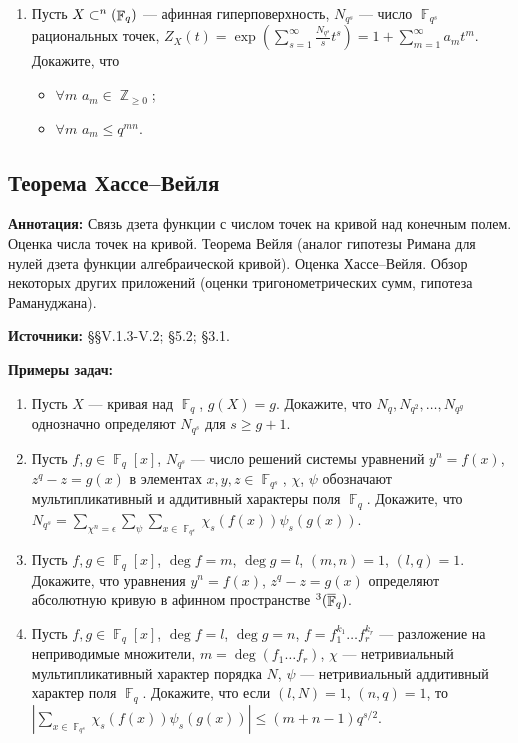 \documentclass[a4paper, 12pt]{article}
\DeclareMathOperator{\ZZ}{\mathbb{Z}}
\let\AA\relax
\DeclareMathOperator{\AA}{\mathbb{A}}
\DeclareMathOperator{\FF}{\mathbb{F}}
\begin{document}
\begin{enumerate}[noitemsep,topsep=0pt]
    \item Пусть $X\subset \AA^n(\FF_q)$ --- афинная гиперповерхность, $N_{q^s}$ --- число $\FF_{q^s}$ рациональных точек, $Z_X(t)=\exp\left(\sum_{s=1}^\infty \frac{N_{q^s}}{s} t^s\right) = 1+\sum_{m=1}^\infty a_m t^m$. Докажите, что 
    \begin{itemize}[noitemsep,topsep=0pt]
        \item $\forall m$ $a_m\in\ZZ_{\geqslant 0}$;
        \item $\forall m$ $a_m\leqslant q^{mn}$.
    \end{itemize} %
\end{enumerate}

\subsection{Теорема Хассе--Вейля}

{\bf Аннотация:} Связь дзета функции с числом точек на кривой над конечным полем. Оценка числа точек на кривой. Теорема Вейля (аналог гипотезы Римана для нулей дзета функции алгебраической кривой). Оценка Хассе--Вейля. Обзор некоторых других приложений (оценки тригонометрических сумм, гипотеза Рамануджана).

{\bf Источники:} \cite{Step} \S\S V.1.3-V.2; \cite{Stich}  \S 5.2; \cite{VNTs} \S 3.1.

{\bf Примеры задач:}
\begin{enumerate}[noitemsep,topsep=0pt]
    \item Пусть $X$ --- кривая над $\FF_q$, $g(X)=g$. Докажите, что $N_{q},N_{q^2},\dots, N_{q^g}$ однозначно определяют $N_{q^s}$ для $s\geqslant g+1$. %
    \item Пусть $f,g\in\FF_q[x]$, $N_{q^s}$ --- число решений системы уравнений $y^n=f(x)$, $z^q-z=g(x)$ в элементах $x,y,z\in\FF_{q^s}$, $\chi$, $\psi$ обозначают мультипликативный и аддитивный характеры поля $\FF_q$. Докажите, что $N_{q^s}=\sum_{\chi^n=\epsilon}\sum_{\psi}\sum_{x\in\FF_{q^s}} \chi_s(f(x))\psi_s(g(x))$. %
    \item Пусть $f,g\in\FF_q[x]$, $\deg f = m$, $\deg g = l$, $(m,n)=1$, $(l,q)=1$. Докажите, что уравнения $y^n=f(x)$, $z^q-z=g(x)$ определяют абсолютную кривую в афинном пространстве $\AA^3(\overline{\FF}_q)$. %
    \item Пусть $f,g\in\FF_q[x]$, $\deg f = l$, $\deg g = n$, $f=f_1^{k_1}\dots f_r^{k_r}$ --- разложение на неприводимые множители, $m=\deg(f_1\dots f_r)$, $\chi$ --- нетривиальный мультипликативный характер порядка $N$, $\psi$ --- нетривиальный аддитивный характер  поля $\FF_q$. Докажите, что если $(l,N)=1$, $(n,q)=1$, то $\left|\sum_{x\in\FF_{q^s}} \chi_s(f(x)) \psi_s(g(x))\right| \leqslant (m+n-1) q^{s/2}$. %
\end{enumerate}
\end{document}
